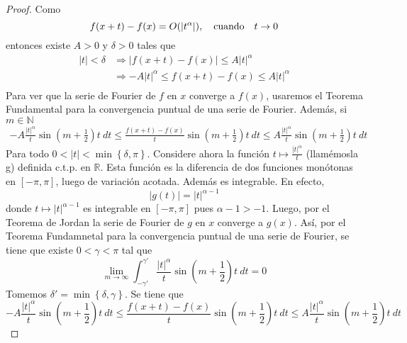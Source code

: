 \documentclass[12pt]{report}
\theoremstyle{largebreak}
\renewcommand{\leq}{\ensuremath{\leqslant}}
\newcommand\abs[1]{\ensuremath{\left|#1\right|}}
\begin{document}
    \begin{proof}
        Como
        \begin{equation*}
            f(x+t)-f(x)=O(\abs{t^\alpha}),\quad\textup{cuando}\quad t\rightarrow 0
        \end{equation*}
        entonces existe $A>0$ y $\delta>0$ tales que
        \begin{equation*}
            \begin{split}
                \abs{t}<\delta&\Rightarrow \abs{f(x+t)-f(x)}\leq A\abs{t}^\alpha\\
                &\Rightarrow -A\abs{t}^\alpha\leq f(x+t)-f(x)\leq A\abs{t}^\alpha\\
            \end{split}
        \end{equation*}
        Para ver que la serie de Fourier de $f$ en $x$ converge a $f(x)$, usaremos el Teorema Fundamental para la convergencia puntual de una serie de Fourier. Además, si $m\in\mathbb{N}$
        \begin{equation*}
            \begin{split}
                -A\frac{\abs{t}^\alpha}{t}\sin\left(m+\frac{1}{2}\right)t\:dt \leq \frac{f(x+t)-f(x)}{t}\sin\left(m+\frac{1}{2}\right)t\:dt\leq A\frac{\abs{t}^\alpha}{t}\sin\left(m+\frac{1}{2}\right)t\:dt
            \end{split}
        \end{equation*}
        Para todo $0<\abs{t}<\min\left\{\delta,\pi\right\}$. Considere ahora la función $t\mapsto\frac{\abs{t}^\alpha}{t}$ (llamémosla g) definida c.t.p. en $\mathbb{R}$. Esta función es la diferencia de dos funciones monótonas en $[-\pi,\pi]$, luego de variación acotada. Además es integrable. En efecto,
        \begin{equation*}
            \abs{g(t)}=\abs{t}^{\alpha-1}
        \end{equation*}
        donde $t\mapsto \abs{t}^{\alpha-1}$ es integrable en $[-\pi,\pi]$ pues $\alpha-1>-1$. Luego, por el Teorema de Jordan la serie de Fourier de $g$ en $x$ converge a $g(x)$. Así, por el Teorema Fundamnetal para la convergencia puntual de una serie de Fourier, se tiene que existe $0<\gamma<\pi$ tal que
        \begin{equation*}
            \lim_{ m\rightarrow\infty}\int_{-\gamma'}^{\gamma'}\frac{\abs{t}^\alpha}{t}\sin\left(m+\frac{1}{2}\right)t\:dt=0
        \end{equation*}
        Tomemos $\delta'=\min\left\{\delta,\gamma\right\}$. Se tiene que
        \begin{equation*}
            -A\frac{\abs{t}^\alpha}{t}\sin\left(m+\frac{1}{2}\right)t\:dt \leq \frac{f(x+t)-f(x)}{t}\sin\left(m+\frac{1}{2}\right)t\:dt\leq A\frac{\abs{t}^\alpha}{t}\sin\left(m+\frac{1}{2}\right)t\:dt
        \end{equation*}
    \end{proof}
\end{document}
